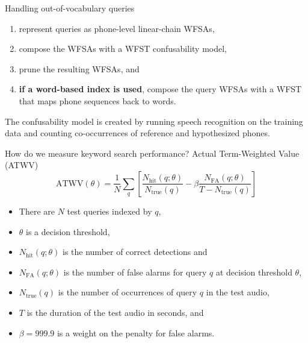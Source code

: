 \begin{frame}{Handling out-of-vocabulary queries}{}
  \begin{enumerate}
  \item represent queries as phone-level linear-chain WFSAs,
  \item compose the WFSAs with a WFST \alert{confusability} model,
  \item prune the resulting WFSAs, and
  \item {\bf if a word-based index is used}, compose the query WFSAs
    with a WFST that maps phone sequences back to words.
  \end{enumerate}
  \vfill
  The confusability model is created by running speech recognition on
  the training data and counting co-occurrences of reference and
  hypothesized phones.
  \vfill
\end{frame}

\begin{frame}{How do we measure keyword search performance?}
  {Actual Term-Weighted Value (ATWV)}
  \begin{equation*}
    \text{ATWV}(\theta) = \frac{1}{N}\sum_{q}
    \left[
      \frac{N_{\text{hit}}(q;\theta)}{N_{\text{true}}(q)} -
      \beta \frac{N_{\text{FA}}(q;\theta)}{T - N_{\text{true}}(q)}
      \right]
  \end{equation*}
  \begin{itemize}
  \item There are $N$ test queries indexed by $q$,
  \item $\theta$ is a decision threshold,
  \item $N_{\text{hit}}(q;\theta)$ is the number of correct detections and
  \item $N_{\text{FA}}(q;\theta)$ is the number of false alarms for
    query $q$ at decision threshold $\theta$, 
  \item $N_{\text{true}}(q)$ is the number of occurrences of query $q$
    in the test audio,
  \item $T$ is the duration of the test audio in seconds, and
  \item $\beta = 999.9$ is a weight on the penalty for false alarms.
  \end{itemize}
\end{frame}

